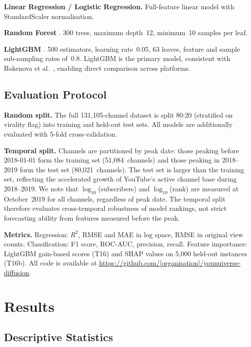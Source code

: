 \documentclass[journal,article,submit,pdftex,moreauthors]{Definitions/mdpi}
\begin{document}
\textbf{Linear Regression / Logistic Regression.}
Full-feature linear model with StandardScaler normalisation.

\textbf{Random Forest} \cite{ref-breiman2001}.
300 trees, maximum depth~12, minimum~10 samples per leaf.

\textbf{LightGBM} \cite{ref-ke2017}.
500 estimators, learning rate~0.05, 63 leaves, feature and sample
sub-sampling rates of~0.8.
LightGBM is the primary model, consistent with Bakenova et al.\
\cite{ref-paper1}, enabling direct comparison across platforms.

\subsection{Evaluation Protocol}
\label{sec:evaluation}

\textbf{Random split.}
The full 131,105-channel dataset is split 80:20 (stratified on virality
flag) into training and held-out test sets.
All models are additionally evaluated with 5-fold cross-validation.

\textbf{Temporal split.}
Channels are partitioned by peak date: those peaking before 2018-01-01
form the training set (51,084~channels) and those peaking in 2018--2019
form the test set (80,021~channels).
The test set is larger than the training set, reflecting the accelerated
growth of YouTube's active channel base during 2018--2019.
We note that $\log_{10}$(subscribers) and $\log_{10}$(rank) are measured
at October~2019 for all channels, regardless of peak date.
The temporal split therefore evaluates cross-temporal robustness of model
rankings, not strict forecasting ability from features measured before
the peak.

\textbf{Metrics.}
Regression: $R^2$, RMSE and MAE in log space, RMSE in original view
counts.
Classification: F1 score, ROC-AUC, precision, recall.
Feature importance: LightGBM gain-based scores (T16) and SHAP values
\cite{ref-lundberg2017,ref-lundberg2019} on 5,000 held-out instances
(T16b).
All code is available at
\url{https://github.com/[organisation]/younuiverse-diffusion}.

\section{Results}
\label{sec:results}

\subsection{Descriptive Statistics}
\label{sec:descriptive}
\end{document}
